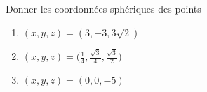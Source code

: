 
\begin{exercice}\label{exoOutilsMath-0007}

	Donner les coordonnées sphériques des points
	\begin{enumerate}
		\item
			$(x,y,z)=(3,-3,3\sqrt{2})$
		\item
			$(x,y,z)=\big( \frac{ 1 }{ 4 },\frac{ \sqrt{3} }{ 4 },\frac{ \sqrt{3} }{2} \big)$
		\item
			$(x,y,z)=(0,0,-5)$
	\end{enumerate}

\end{exercice}
